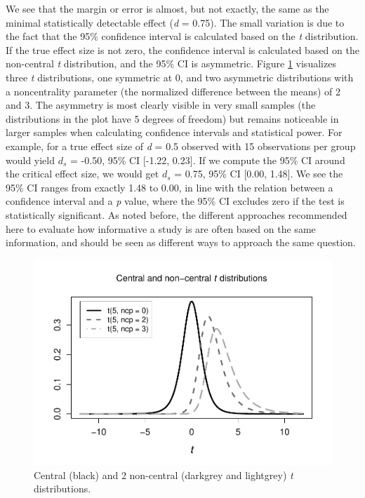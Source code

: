 \documentclass[
  english,
  ,jou, a4paper,floatsintext]{apa6}
\begin{document}
We see that the margin or error is almost, but not exactly, the same as the minimal statistically detectable effect (\emph{d} = 0.75). The small variation is due to the fact that the 95\% confidence interval is calculated based on the \emph{t} distribution. If the true effect size is not zero, the confidence interval is calculated based on the non-central \emph{t} distribution, and the 95\% CI is asymmetric. Figure \ref{fig:noncentralt} visualizes three \emph{t} distributions, one symmetric at 0, and two asymmetric distributions with a noncentrality parameter (the normalized difference between the means) of 2 and 3. The asymmetry is most clearly visible in very small samples (the distributions in the plot have 5 degrees of freedom) but remains noticeable in larger samples when calculating confidence intervals and statistical power. For example, for a true effect size of \emph{d} = 0.5 observed with 15 observations per group would yield \(d_s\) = -0.50, 95\% CI {[}-1.22, 0.23{]}. If we compute the 95\% CI around the critical effect size, we would get \(d_s\) = 0.75, 95\% CI {[}0.00, 1.48{]}. We see the 95\% CI ranges from exactly 1.48 to 0.00, in line with the relation between a confidence interval and a \emph{p} value, where the 95\% CI excludes zero if the test is statistically significant. As noted before, the different approaches recommended here to evaluate how informative a study is are often based on the same information, and should be seen as different ways to approach the same question.

\begin{figure}
\centering
\includegraphics{sample_size_justification_files/figure-latex/noncentralt-1.pdf}
\caption{\label{fig:noncentralt}Central (black) and 2 non-central (darkgrey and lightgrey) \emph{t} distributions.}
\end{figure}
\end{document}
